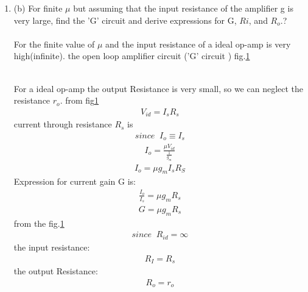 \begin{enumerate}[label=\thesection.\arabic*.,ref=\thesection.\theenumi]
\item
\label{Question_1b_ee18btech11023}
(b) For finite $\mu$ but assuming that the input resistance of the
amplifier g is very large, find the 'G' circuit and derive
expressions for G, $Ri$, and $R_o$.?
\\
\solution\\
For the finite value of $\mu$ and the input resistance of a ideal op-amp is very high(infinite).
the open loop amplifier circuit ('G' circuit ) fig.\ref{fig:small ckt}
\begin{figure}[!ht]
	\begin{center}
			\resizebox{\columnwidth}{!}{}
	\end{center}
\caption{}
\label{fig:small ckt}
\end{figure}\\

For a ideal op-amp the output Resistance is very small, so we can neglect the resistance $r_o$.  from fig\ref{fig:small ckt}
\begin{align}
    V_{id} = I_sR_s
    \label{eq_ee18btech11023_7}
\end{align}
current through resistance $R_s$ is
\begin{align*}
    since\;\;I_o \equiv I_s
\end{align*}
\begin{align}
    I_o = \frac{\mu V_{id}}{\frac{1}{g_m}} 
    \label{eq_ee18btech11023_8}
\end{align}
\begin{align}
    I_o = \mu g_m I_s R_S
    \label{eq_ee18btech11023_9}
\end{align}
Expression for current gain G is:
\begin{align}
    \frac{I_o}{I_s} = \mu g_m R_s
    \label{eq_ee18btech11023_10}
\end{align}
\begin{align}
    G = \mu g_m R_s
    \label{eq_ee18btech11023_11}
\end{align}
from the fig.\ref{fig:small ckt}
\begin{align*}
    since \;\; R_{id} = \infty
\end{align*}
the input resistance:
\begin{align}
    R_I = R_s
    \label{eq_ee18btech11023_12}
\end{align}
the output Resistance:
\begin{align}
    R_o = r_o
    \label{eq_ee18btech11023_13}
\end{align}


\end{enumerate}
